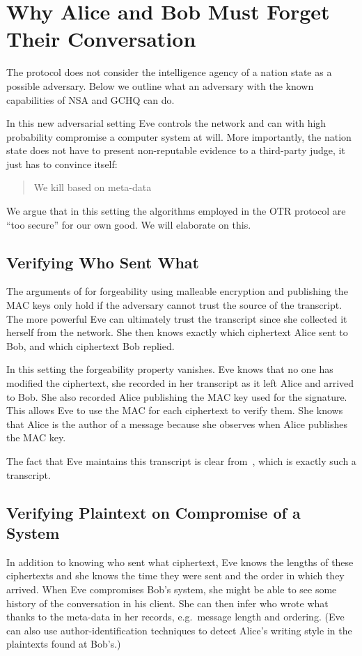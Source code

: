 \section{Why Alice and Bob Must Forget Their Conversation}
\label{sec:otrattacks}

The protocol does not consider the intelligence agency of a nation state as 
a possible adversary.
Below we outline what an adversary with the known capabilities of \ac{NSA} and 
\ac{GCHQ} can do.

In this new adversarial setting Eve controls the network and can with high 
probability compromise a computer system at will.
More importantly, the nation state does not have to present non-reputable 
evidence to a third-party judge, it just has to convince itself: 
\blockcquote{metadatakill}{We kill based on meta-data}.
We argue that in this setting the algorithms employed in the \ac{OTR} protocol 
are \enquote{too secure} for our own good.
We will elaborate on this.

\subsection{Verifying Who Sent What}

The arguments of \citet{otr2004} for forgeability using malleable encryption 
and publishing the \ac{MAC} keys only hold if the adversary cannot trust the 
source of the transcript.
The more powerful Eve can ultimately trust the transcript since she collected 
it herself from the network.
She then knows exactly which ciphertext Alice sent to Bob, and which ciphertext 
Bob replied.

In this setting the forgeability property vanishes.
Eve knows that no one has modified the ciphertext, she recorded in her 
transcript as it left Alice and arrived to Bob.
She also recorded Alice publishing the \ac{MAC} key used for the signature.
This allows Eve to use the \ac{MAC} for each ciphertext to verify them.
She knows that Alice is the author of a message because she observes when Alice 
publishes the \ac{MAC} key.

The fact that Eve maintains this transcript is clear from~\cite{spiegelotr}, 
which is exactly such a transcript.

\subsection{Verifying Plaintext on Compromise of a System}

In addition to knowing who sent what ciphertext, Eve knows the lengths of these 
ciphertexts and she knows the time they were sent and the order in which they 
arrived.
When Eve compromises Bob's system, she might be able to see some history of the 
conversation in his client.
She can then infer who wrote what thanks to the meta-data in her records, 
e.g.~message length and ordering.
(Eve can also use author-identification techniques to detect Alice's writing 
style in the plaintexts found at Bob's.)

